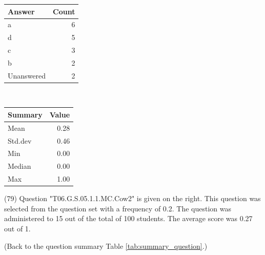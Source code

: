 \documentclass[12pt,nohyper]{tufte-handout}\usepackage[]{graphicx}\usepackage[]{color}
\begin{document}
\begin{center}%
\begin{tabular}{lr}
  \hline
Answer & Count \\ 
  \hline
a &   6 \\ 
  d &   5 \\ 
  c &   3 \\ 
  b &   2 \\ 
  Unanswered &   2 \\ 
   \hline
\end{tabular}
~~~~~~~~%
\begin{tabular}{lr}
  \hline
Summary & Value \\ 
  \hline
Mean & 0.28 \\ 
  Std.dev & 0.46 \\ 
  Min & 0.00 \\ 
  Median & 0.00 \\ 
  Max & 1.00 \\ 
   \hline
\end{tabular}
\end{center}\newpage{} (79) Question "T06.G.S.05.1.1.MC.Cow2" is given on the right. This question was selected from the question set with a frequency of 0.2. The question was administered to 15 out of the total of 100 students. The average score was 0.27 out of 1.

 (Back to the question summary Table \ref{tab:summary_question}.)
\end{document}
